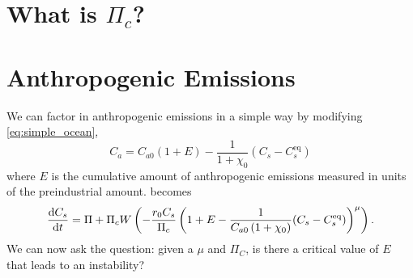 \section{What is $\Pi_c$?}

\section{Anthropogenic Emissions}
We can factor in anthropogenic emissions in a simple way by modifying \cref{eq:simple_ocean},
\begin{equation}
  \label{eq:simple_ocean_emissions}
  C_a = C_{a0}(1 + E) - \frac{1}{1+\chi_0}(C_s-C_s^{\mathrm{eq}})
\end{equation}
where $E$ is the cumulative amount of anthropogenic emissions measured in units of the preindustrial amount. 
becomes
\begin{equation}
  \label{eq:global_soil_carbon_emissions}
  \dv{C_s}{t} = \Pi + \Pi_c W\left(-\frac{r_0C_s}{\Pi_c} \left(1 + E - \frac{1}{C_{a0}\left(1+\chi_0\right)}(C_s-C_s^{\mathrm{eq}})\right)^\mu \right).
\end{equation}
We can now ask the question: given a $\mu$ and $\Pi_C$, is there a critical value of $E$ that leads to an instability?
